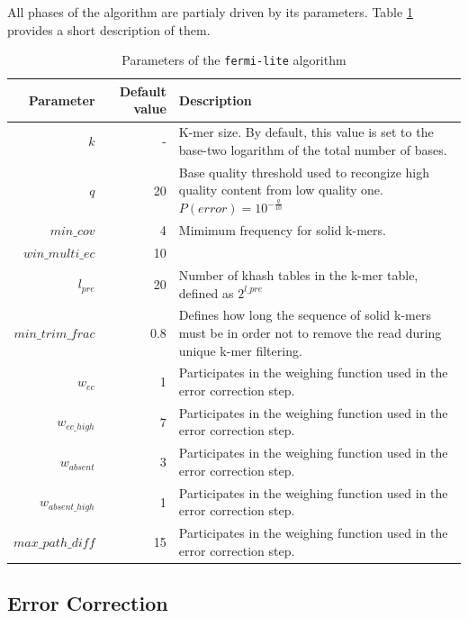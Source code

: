 All phases of the algorithm are partialy driven by its parameters. Table \ref{tab:fermi-parameters} provides a short description of them.

\begin{table}[h]
\begin{center}
\caption{Parameters of the \texttt{fermi-lite} algorithm}
\label{tab:fermi-parameters}
\begin{tabular}{| r | r | p{5cm} |}
\hline
Parameter & Default value & Description \\
\hline
$k$ & - & K-mer size. By default, this value is set to the base-two logarithm of the total number of bases. \\
\hline
$q$ & 20 & Base quality threshold used to recongize high quality content from low quality one. $P(error) = 10^{-\frac{q}{10}}$ \\
\hline
$min\_cov$ & 4 & Mimimum frequency for solid k-mers. \\
\hline
$win\_multi\_ec$ & 10 &  \\
\hline
$l_{pre}$ & 20 & Number of khash tables in the k-mer table, defined as $2^{l\_pre}$ \\
\hline
$min\_trim\_frac$ & 0.8 &  Defines how long the sequence of solid k-mers must be in order not to remove the read during unique k-mer filtering. \\
\hline
$w_{ec}$ & 1 & Participates in the weighing function used in the error correction step.\\
\hline
$w_{ec\_high}$ & 7 & Participates in the weighing function used in the error correction step. \\
\hline
$w_{absent}$ & 3 & Participates in the weighing function used in the error correction step. \\
\hline
$w_{absent\_high}$ & 1 & Participates in the weighing function used in the error correction step. \\ 
\hline
$max\_path\_diff$ & 15 & Participates in the weighing function used in the error correction step. \\ 
\hline
\end{tabular}
\end{center}
\end{table}

\subsection{Error Correction}
\label{subsec:fermi-error-correction}

